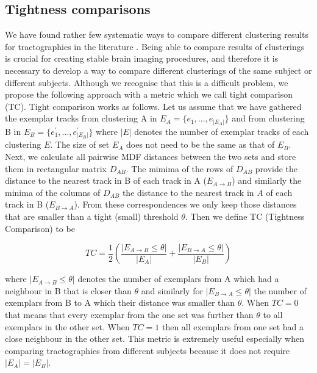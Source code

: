 \documentclass[preprint,authoryear,a4paper,10pt,onecolumn]{elsarticle}
\begin{document}
\subsection{Tightness comparisons\label{sub:Tightness-comparisons-1}}

We have found rather few systematic ways to compare different clustering
results for tractographies in the literature
\citep{moberts2005evaluation}.  Being able to compare results of
clusterings is crucial for creating stable brain imaging procedures, and
therefore it is necessary to develop a way to compare different
clusterings of the same subject or different subjects. Although we
recognise that this is a difficult problem, we propose the following
approach with a metric which we call tight comparison (TC). Tight
comparison works as follows. Let us assume that we have gathered the
exemplar tracks from clustering A in $E_{A}=\{e_{1},...,e_{|E_{A}|}\}$
and from clustering B in $E_{B}=\{e_{1}^{'},...,e_{|E_{B}|}^{'}\}$
where $|E|$ denotes the number of exemplar tracks of each clustering
$E$. The size of set $E_{A}$ does not need to be the same as that of
$E_{B}$. Next, we calculate all pairwise MDF distances
between the two sets and store them in rectangular matrix $D_{AB}$. The
mimima of the rows of $D_{AB}$ provide the distance to the nearest track
in B of each track in A ($E_{A\rightarrow B}$) and similarly
the minima of the columns of $D_{AB}$ the distance to the nearest track
in $A$ of each track in B ($E_{B\rightarrow A}$). From these
correspondences we only keep those distances that are smaller than a
tight (small) threshold $\theta$. Then we define TC (Tightness
Comparison) to be

\begin{equation}
TC=\frac{1}{2}\left(\frac{|E_{A\rightarrow B}\leq \theta |}{|E_{A}|}+\frac{|E_{B\rightarrow A}\leq \theta |}{|E_{B}|}\right)\end{equation}


where $|E_{A\rightarrow B}\leq \theta |$ denotes the number of
exemplars from A which had a neighbour in B that is closer than
$\theta$ and similarly for $|E_{B\rightarrow A}\leq
\theta |$ the number of exemplars from B to A which their
distance was smaller than $\theta$. When $TC=0$ that means
that every exemplar from the one set was further than $\theta$
to all exemplars in the other set. When $TC=1$ then all exemplars from
one set had a close neighbour in the other set. This metric is extremely
useful especially when comparing tractographies from different subjects
because it does not require $|E_{A}|=|E_{B}|$.
\end{document}
